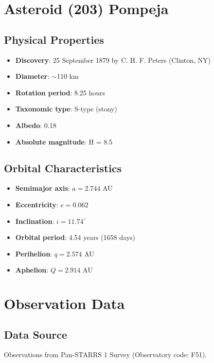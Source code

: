 \section{Asteroid (203) Pompeja}

\subsection{Physical Properties}

\begin{itemize}
    \item \textbf{Discovery}: 25 September 1879 by C. H. F. Peters (Clinton, NY)
    \item \textbf{Diameter}: $\sim$110 km
    \item \textbf{Rotation period}: 8.25 hours
    \item \textbf{Taxonomic type}: S-type (stony)
    \item \textbf{Albedo}: 0.18
    \item \textbf{Absolute magnitude}: H = 8.5
\end{itemize}

\subsection{Orbital Characteristics}

\begin{itemize}
    \item \textbf{Semimajor axis}: $a = 2.744$ AU
    \item \textbf{Eccentricity}: $e = 0.062$
    \item \textbf{Inclination}: $i = 11.74^\circ$
    \item \textbf{Orbital period}: 4.54 years (1658 days)
    \item \textbf{Perihelion}: $q = 2.574$ AU
    \item \textbf{Aphelion}: $Q = 2.914$ AU
\end{itemize}

\section{Observation Data}

\subsection{Data Source}

Observations from Pan-STARRS 1 Survey (Observatory code: F51).

